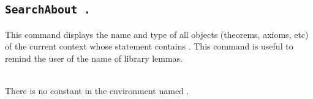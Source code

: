 \subsection[\tt SearchAbout {\qualid}.]{\tt SearchAbout {\qualid}.}
This command displays the name and type of all objects (theorems,
axioms, etc) of the current context whose statement contains \qualid.
This command is useful to remind the user of the name of library
lemmas.

\begin{ErrMsgs}
\item {}\\
    There is no constant in the environment named \qualid.
\end{ErrMsgs}

